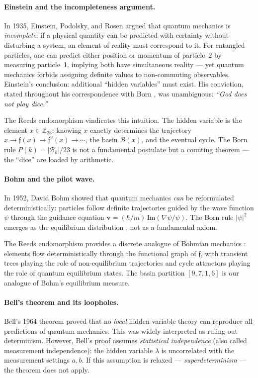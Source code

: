 \documentclass[12pt,a4paper]{article}
\theoremstyle{definition}
\theoremstyle{remark}
\newcommand{\Reeds}{\mathfrak{f}}
\newcommand{\Zp}{\mathbb{Z}_{23}}
\newcommand{\Basin}{\mathcal{B}}
\begin{document}
\paragraph{Einstein and the incompleteness argument.}
In 1935, Einstein, Podolsky, and Rosen \cite{epr1935} argued that quantum
mechanics is \emph{incomplete}: if a physical quantity can be predicted with
certainty without disturbing a system, an element of reality must correspond to
it. For entangled particles, one can predict either position or momentum of
particle~2 by measuring particle~1, implying both have simultaneous reality ---
yet quantum mechanics forbids assigning definite values to non-commuting
observables. Einstein's conclusion: additional ``hidden variables'' must exist.
His conviction, stated throughout his correspondence with Born
\cite{einstein_born}, was unambiguous: \emph{``God does not play dice.''}

The Reeds endomorphism vindicates this intuition. The hidden variable is the
element $x \in \Zp$: knowing $x$ exactly determines the trajectory
$x \to \Reeds(x) \to \Reeds^2(x) \to \cdots$, the basin $\Basin(x)$, and the
eventual cycle. The Born rule $P(k) = |\Basin_k|/23$ is not a fundamental
postulate but a counting theorem --- the ``dice'' are loaded by arithmetic.

\paragraph{Bohm and the pilot wave.}
In 1952, David Bohm \cite{bohm1952} showed that quantum mechanics \emph{can}
be reformulated deterministically: particles follow definite trajectories
guided by the wave function $\psi$ through the guidance equation
$\mathbf{v} = (\hbar/m)\, \mathrm{Im}(\nabla\psi/\psi)$. The Born rule
$|\psi|^2$ emerges as the equilibrium distribution \cite{durr1992}, not as a
fundamental axiom.

The Reeds endomorphism provides a discrete analogue of Bohmian mechanics
\cite{bohm_hiley1993}: elements flow deterministically through the functional
graph of $\Reeds$, with transient trees playing the role of non-equilibrium
trajectories and cycle attractors playing the role of quantum equilibrium states.
The basin partition $[9,7,1,6]$ is our analogue of Bohm's equilibrium measure.

\paragraph{Bell's theorem and its loopholes.}
Bell's 1964 theorem \cite{bell1964} proved that no \emph{local} hidden-variable
theory can reproduce all predictions of quantum mechanics. This was widely
interpreted as ruling out determinism. However, Bell's proof assumes
\emph{statistical independence} (also called measurement independence): the
hidden variable $\lambda$ is uncorrelated with the measurement settings $a, b$.
If this assumption is relaxed --- \emph{superdeterminism} --- the theorem does
not apply.
\end{document}
